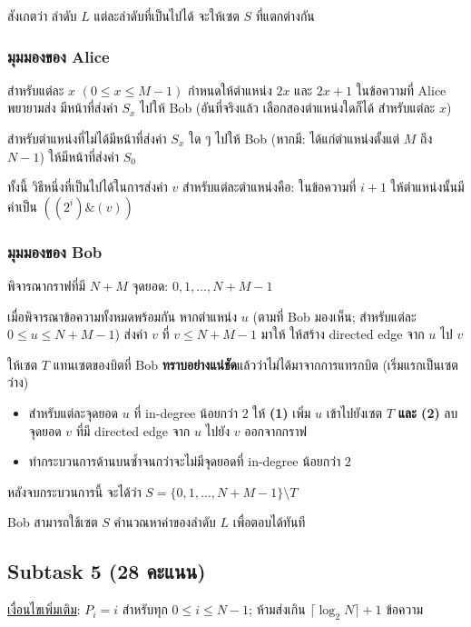 \documentclass[12pt]{article}
\begin{document}
สังเกตว่า ลำดับ $L$ แต่ละลำดับที่เป็นไปได้ จะให้เซต $S$ ที่แตกต่างกัน

\subsubsection{มุมมองของ Alice}

สำหรับแต่ละ $x$ $(0 \leq x \leq M-1)$ กำหนดให้ตำแหน่ง $2x$  และ $2x+1$  ในข้อความที่ Alice พยายามส่ง มีหน้าที่ส่งค่า $S_x$ ไปให้ Bob (อันที่จริงแล้ว เลือกสองตำแหน่งใดก็ได้ สำหรับแต่ละ $x$)

สำหรับตำแหน่งที่ไม่ได้มีหน้าที่ส่งค่า $S_x$ ใด ๆ ไปให้ Bob (หากมี: ได้แก่ตำแหน่งตั้งแต่ $M$ ถึง $N-1$) ให้มีหน้าที่ส่งค่า $S_0$

ทั้งนี้ วิธีหนึ่งที่เป็นไปได้ในการส่งค่า $v$ สำหรับแต่ละตำแหน่งคือ: ในข้อความที่ $i+1$ ให้ตำแหน่งนั้นมีค่าเป็น $((2^i) \& (v))$

\subsubsection{มุมมองของ Bob}

พิจารณากราฟที่มี $N+M$ จุดยอด: $0, 1, \ldots, N+M-1$

เมื่อพิจารณาข้อความทั้งหมดพร้อมกัน หากตำแหน่ง $u$  (ตามที่ Bob มองเห็น; สำหรับแต่ละ $0 \leq u \leq N+M-1$) ส่งค่า $v$  ที่ $v \leq N+M-1$ มาให้ ให้สร้าง directed edge จาก $u$  ไป $v$

ให้เซต $T$ แทนเซตของบิตที่ Bob \textbf{ทราบอย่างแน่ชัด}แล้วว่าไม่ได้มาจากการแทรกบิต (เริ่มแรกเป็นเซตว่าง)

\begin{itemize}
\item สำหรับแต่ละจุดยอด $u$ ที่ in-degree น้อยกว่า $2$ ให้ \textbf{(1)} เพิ่ม $u$ เข้าไปยังเซต $T$  \textbf{และ (2)} ลบจุดยอด $v$ ที่มี directed edge จาก $u$ ไปยัง $v$  ออกจากกราฟ
\item ทำกระบวนการด้านบนซ้ำจนกว่าจะไม่มีจุดยอดที่ in-degree น้อยกว่า $2$
\end{itemize}

หลังจบกระบวนการนี้ จะได้ว่า $S = \{0, 1, \ldots, N+M-1\} \setminus T$

Bob สามารถใช้เซต $S$ คำนวณหาค่าของลำดับ $L$ เพื่อตอบได้ทันที

\subsection{Subtask 5 (28 คะแนน)}

\underline{เงื่อนไขเพิ่มเติม}: $P_i = i$ สำหรับทุก $0 \leq i \leq N-1$; ห้ามส่งเกิน $\lceil \log_2 N \rceil + 1$ ข้อความ
\end{document}
